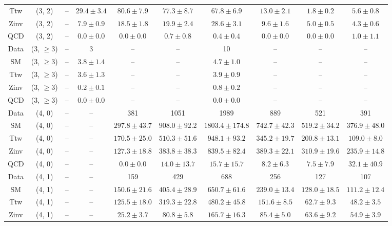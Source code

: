 \begin{table}[h!]
{\begin{tabular}{cccccccccc}
	Ttw & (3, 2) & -- & $29.4\pm 3.4$ & $80.6\pm 7.9$ & $77.3\pm 8.7$ & $67.8\pm 6.9$ & $13.0\pm 2.1$ & $1.8\pm 0.2$ & $5.6\pm 0.8$ \\[0.5ex] 
	Zinv & (3, 2) & -- & $7.9\pm 0.9$ & $18.5\pm 1.8$ & $19.9\pm 2.4$ & $28.6\pm 3.1$ & $9.6\pm 1.6$ & $5.0\pm 0.5$ & $4.3\pm 0.6$ \\[0.5ex] 
	QCD & (3, 2) & -- & $0.0\pm 0.0$ & $0.0\pm 0.0$ & $0.7\pm 0.8$ & $0.4\pm 0.4$ & $0.0\pm 0.0$ & $0.0\pm 0.0$ & $1.0\pm 1.1$ \\[0.5ex] 
	Data & (3, $\ge3$) & -- & 3 & -- & -- & 10 & -- & -- & -- \\[0.5ex] 
	SM & (3, $\ge3$) & -- & $3.8\pm 1.4$ & -- & -- & $4.7\pm 1.0$ & -- & -- & -- \\[0.5ex] 
	Ttw & (3, $\ge3$) & -- & $3.6\pm 1.3$ & -- & -- & $3.9\pm 0.9$ & -- & -- & -- \\[0.5ex] 
	Zinv & (3, $\ge3$) & -- & $0.2\pm 0.1$ & -- & -- & $0.8\pm 0.2$ & -- & -- & -- \\[0.5ex] 
	QCD & (3, $\ge3$) & -- & $0.0\pm 0.0$ & -- & -- & $0.0\pm 0.0$ & -- & -- & -- \\[0.5ex] 
	Data & (4, 0) & -- & -- & 381 & 1051 & 1989 & 889 & 521 & 391 \\[0.5ex] 
	SM & (4, 0) & -- & -- & $297.8\pm 43.7$ & $908.0\pm 92.2$ & $1803.4\pm 174.8$ & $742.7\pm 42.3$ & $519.2\pm 34.2$ & $376.9\pm 48.0$ \\[0.5ex] 
	Ttw & (4, 0) & -- & -- & $170.5\pm 25.0$ & $510.3\pm 51.6$ & $948.1\pm 93.2$ & $345.2\pm 19.7$ & $200.8\pm 13.1$ & $109.0\pm 8.0$ \\[0.5ex] 
	Zinv & (4, 0) & -- & -- & $127.3\pm 18.8$ & $383.8\pm 38.3$ & $839.5\pm 82.4$ & $389.3\pm 22.1$ & $310.9\pm 19.6$ & $235.9\pm 14.8$ \\[0.5ex] 
	QCD & (4, 0) & -- & -- & $0.0\pm 0.0$ & $14.0\pm 13.7$ & $15.7\pm 15.7$ & $8.2\pm 6.3$ & $7.5\pm 7.9$ & $32.1\pm 40.9$ \\[0.5ex] 
	Data & (4, 1) & -- & -- & 159 & 429 & 688 & 256 & 127 & 107 \\[0.5ex] 
	SM & (4, 1) & -- & -- & $150.6\pm 21.6$ & $405.4\pm 28.9$ & $650.7\pm 61.6$ & $239.0\pm 13.4$ & $128.0\pm 18.5$ & $111.2\pm 12.4$ \\[0.5ex] 
	Ttw & (4, 1) & -- & -- & $125.5\pm 18.0$ & $319.3\pm 22.8$ & $480.2\pm 45.8$ & $151.6\pm 8.5$ & $62.7\pm 9.3$ & $48.2\pm 3.5$ \\[0.5ex] 
	Zinv & (4, 1) & -- & -- & $25.2\pm 3.7$ & $80.8\pm 5.8$ & $165.7\pm 16.3$ & $85.4\pm 5.0$ & $63.6\pm 9.2$ & $54.9\pm 3.9$ \\[0.5ex] 

\end{tabular}}
\end{table}
